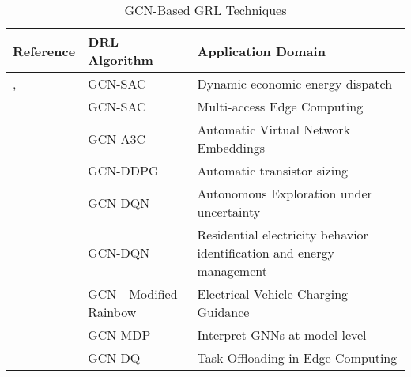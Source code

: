\begin{table}[h!]
	\centering
	\caption{GCN-Based GRL Techniques}
	\begin{tabular}{|P{2cm}|P{2cm}|p{5cm}|  }
		\hline
		\textbf{Reference} & \textbf{DRL Algorithm} & \textbf{Application Domain} \\
		\hline
		\cite{liNovelGraphReinforcement2022}, \cite{chenScalableGraphReinforcement2023} & GCN-SAC & Dynamic economic energy dispatch \\ \hline
		\cite{lengGraphConvolutionalNetworkbased2021} & GCN-SAC & Multi-access Edge Computing \\ \hline
		\cite{yanAutomaticVirtualNetwork2020} & GCN-A3C & Automatic Virtual Network Embeddings \\ \hline
		\cite{wangGCNRLCircuitDesigner2020} & GCN-DDPG & Automatic transistor sizing \\ \hline
		\cite{chenAutonomousExplorationUncertainty2020} & GCN-DQN  & Autonomous Exploration under uncertainty \\  \hline
		\cite{chenGraphRepresentationLearningbased2023} & GCN-DQN & Residential electricity behavior identification and energy management \\ \hline
		\cite{xingGraphReinforcementLearningBased2023} & GCN - Modified Rainbow & Electrical Vehicle Charging Guidance \\ \hline
		\cite{yuanXGNNModelLevelExplanations2020} & GCN-MDP & Interpret GNNs at model-level \\ \hline
		\cite{tangDependentTaskOffloading2020} & GCN-DQ & Task Offloading in Edge Computing \\ \hline
	\end{tabular}
\end{table}




